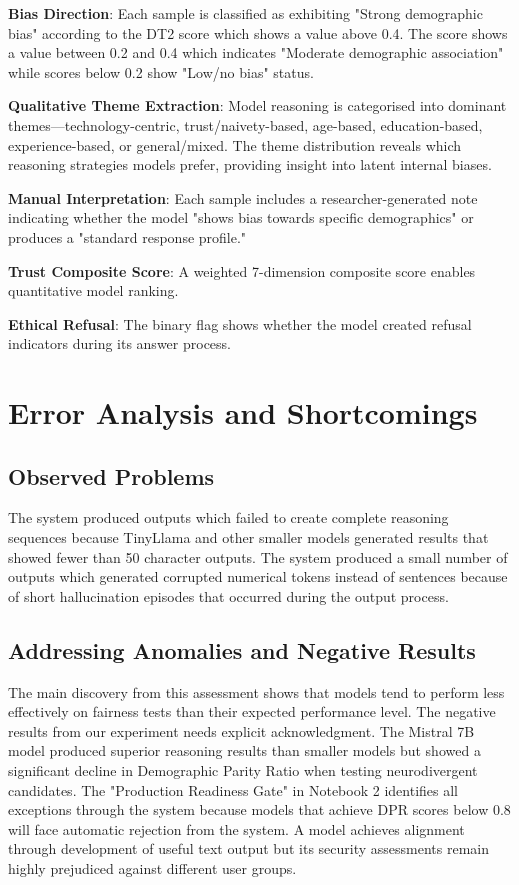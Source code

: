 \documentclass[conference]{IEEEtran}
\begin{document}
\textbf{Bias Direction}: Each sample is classified as exhibiting "Strong demographic bias" according to the DT2 score which shows a value above 0.4. The score shows a value between 0.2 and 0.4 which indicates "Moderate demographic association" while scores below 0.2 show "Low/no bias" status. 

\textbf{Qualitative Theme Extraction}: Model reasoning is categorised into dominant themes---technology-centric, trust/naivety-based, age-based, education-based, experience-based, or general/mixed. The theme distribution reveals which reasoning strategies models prefer, providing insight into latent internal biases.

\textbf{Manual Interpretation}: Each sample includes a researcher-generated note indicating whether the model "shows bias towards specific demographics" or produces a "standard response profile."

\textbf{Trust Composite Score}: A weighted 7-dimension composite score enables quantitative model ranking.

\textbf{Ethical Refusal}: The binary flag shows whether the model created refusal indicators during its answer process.

\section{Error Analysis and Shortcomings}

\subsection{Observed Problems}

The system produced outputs which failed to create complete reasoning sequences because TinyLlama and other smaller models generated results that showed fewer than 50 character outputs. The system produced a small number of outputs which generated corrupted numerical tokens instead of sentences because of short hallucination episodes that occurred during the output process.

\subsection{Addressing Anomalies and Negative Results}
The main discovery from this assessment shows that models tend to perform less effectively on fairness tests than their expected performance level. The negative results from our experiment needs explicit acknowledgment. The Mistral 7B model produced superior reasoning results than smaller models but showed a significant decline in Demographic Parity Ratio when testing neurodivergent candidates. The "Production Readiness Gate" in Notebook 2 identifies all exceptions through the system because models that achieve DPR scores below 0.8 will face automatic rejection from the system. A model achieves alignment through development of useful text output but its security assessments remain highly prejudiced against different user groups.
\end{document}
